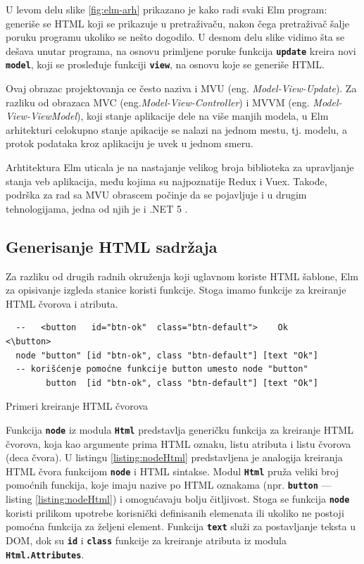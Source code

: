 \documentclass[12pt,oneside]{memoir}
\begin{document}
U levom delu slike \ref{fig:elm-arh} prikazano je kako radi svaki Elm program: generiše
se HTML koji se prikazuje u pretraživaču, nakon čega pretraživač šalje poruku programu
ukoliko se nešto dogodilo. U desnom delu slike vidimo šta se dešava unutar programa,
na osnovu primljene poruke funkcija \texttt{\textbf{update}} kreira novi\texttt{
\textbf{model}}, koji se prosleđuje funkciji \texttt{\textbf{view}}, na osnovu koje
se generiše HTML.

Ovaj obrazac projektovanja ce često naziva i MVU (eng. \emph{Model-View-Update}). Za 
razliku od obrazaca MVC \cite{jsPatterns} (eng.\emph{Model-View-Controller}) i MVVM \cite{jsPatterns}
(eng. \emph{Model-View-ViewModel}), koji stanje aplikacije dele na više manjih modela,
u Elm arhitekturi celokupno stanje apikacije se nalazi na jednom mestu, tj. modelu, a
protok podataka kroz aplikaciju je uvek u jednom smeru. 

Arhtitektura Elm uticala je na nastajanje velikog broja biblioteka za upravljanje
stanja veb aplikacija, među kojima su najpoznatije Redux\cite{redux} i Vuex\cite{vuex}.
Takođe, podrška za rad sa MVU obrascem počinje da se pojavljuje i u drugim tehnologijama,
jedna od njih je i .NET 5 \cite{net5}.

\subsection{Generisanje HTML sadržaja}
Za razliku od drugih radnih okruženja koji uglavnom koriste HTML šablone, Elm za 
opisivanje izgleda stanice koristi funkcije. Stoga imamo funkcije za kreiranje HTML
čvorova i atributa.
\begin{listing}[h]
  \begin{verbatim}
  --   <button   id="btn-ok"  class="btn-default">    Ok      <\button>
  node "button" [id "btn-ok", class "btn-default"] [text "Ok"]
  -- korišćenje pomoćne funkcije button umesto node "button"
        button  [id "btn-ok", class "btn-default"] [text "Ok"]
  \end{verbatim}
  \caption{Primeri kreiranje HTML čvorova}
  \label{listing:nodeHtml}
  \end{listing}
  
Funkcija \texttt{\textbf{node}} iz modula \texttt{\textbf{Html}} predstavlja generičku
funkcija za kreiranje HTML čvorova, koja kao argumente prima HTML oznaku, listu atributa
i listu čvorova (deca čvora). U listingu \ref{listing:nodeHtml} predstavljena je analogija
kreiranja HTML čvora funkcijom \texttt{\textbf{node}} i HTML sintakse.
Modul \texttt{\textbf{Html}} pruža veliki broj pomoćnih funckija, koje imaju nazive po
HTML oznakama (npr. \texttt{\textbf{button}} --- listing \ref{listing:nodeHtml}) i omogućavaju bolju čitljivost. Stoga se 
funkcija \texttt{\textbf{node}} koristi prilikom upotrebe korisnički definisanih elemenata
ili ukoliko ne postoji pomoćna funkcija za željeni element. Funkcija \texttt{\textbf{text}}
služi za postavljanje teksta u DOM, dok su \texttt{\textbf{id}} i \texttt{\textbf{class}}
funkcije za kreiranje atributa iz modula \texttt{\textbf{Html.Attributes}}.
\end{document}
